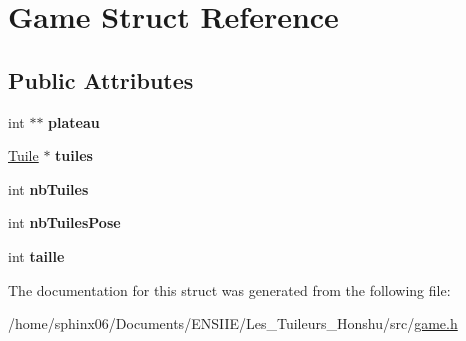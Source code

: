 \hypertarget{structGame}{}\section{Game Struct Reference}
\label{structGame}
\subsection*{Public Attributes}
\begin{DoxyCompactItemize}
\item 
\mbox{\label{structGame_a1decb21080af192386c0a7177a41f277}} 
int $\ast$$\ast$ {\bfseries plateau}
\item 
\mbox{\label{structGame_ac3fb01df4e1e340920e8b97b34d0db0b}} 
\hyperlink{structTuile}{Tuile} $\ast$ {\bfseries tuiles}
\item 
\mbox{\label{structGame_a119de7a9121b7142cd5db52803ae3977}} 
int {\bfseries nb\+Tuiles}
\item 
\mbox{\label{structGame_aec5485e406ead32a4fa474f7ca6f3b1d}} 
int {\bfseries nb\+Tuiles\+Pose}
\item 
\mbox{\label{structGame_ada885d65654c46afafd089933d842b97}} 
int {\bfseries taille}
\end{DoxyCompactItemize}


The documentation for this struct was generated from the following file\+:\begin{DoxyCompactItemize}
\item 
/home/sphinx06/\+Documents/\+E\+N\+S\+I\+I\+E/\+Les\+\_\+\+Tuileurs\+\_\+\+Honshu/src/\hyperlink{game_8h}{game.\+h}\end{DoxyCompactItemize}
